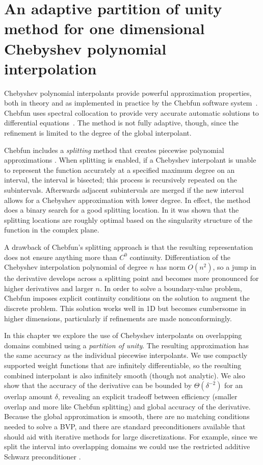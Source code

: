 %
%
\chapter{An adaptive partition of unity method for one dimensional Chebyshev polynomial interpolation}
Chebyshev polynomial interpolants provide powerful approximation properties, both in theory and as implemented in practice by the Chebfun software system~\cite{battles2004extension}. Chebfun uses spectral collocation to provide very accurate automatic solutions to differential equations~\cite{driscoll2008chebop}. The method is not fully adaptive, though, since the refinement is limited to the degree of the global interpolant. 

 Chebfun includes a \textit{splitting} method that creates piecewise polynomial approximations \cite{pachon2010piecewise}. When splitting is enabled, if a Chebyshev interpolant is unable to represent the function accurately at a specified maximum degree on an interval, the interval is bisected; this process is recursively repeated on the subintervals. Afterwards adjacent subintervals are merged if the new interval allows for a Chebyshev approximation with lower degree. In effect, the method does a binary search for a good splitting location. In \cite{driscoll2014optimal} it was shown that the splitting locations are roughly optimal based on the singularity structure of the function in the complex plane. 

A drawback of Chebfun's splitting approach is that the resulting representation does not ensure anything more than $C^0$ continuity. Differentiation of the Chebyshev interpolation polynomial of degree $n$ has norm $O(n^2)$, so a jump in the derivative develops across a splitting point and becomes more pronounced for higher derivatives and larger $n$. In order to solve a boundary-value problem, Chebfun imposes explicit continuity conditions on the solution to augment the discrete problem. This solution works well in 1D but becomes cumbersome in higher dimensions, particularly if refinements are made nonconformingly.

In this chapter we explore the use of Chebyshev interpolants on overlapping domains combined using a \emph{partition of unity}. The resulting approximation has the same accuracy as the individual piecewise interpolants. We use compactly supported weight functions that are infinitely differentiable, so the resulting combined interpolant is also infinitely smooth (though not analytic). We also show that the accuracy of the derivative can be bounded by $\Theta(\delta^{-2})$ for an overlap amount $\delta$, revealing an explicit tradeoff between efficiency (smaller overlap and more like Chebfun splitting) and global accuracy of the derivative. Because the global approximation is smooth, there are no matching conditions needed to solve a BVP, and there are standard preconditioners available that should aid with iterative methods for large discretizations. For example, since we split the interval into overlapping domains we could use the restricted additive Schwarz preconditioner \cite{doi:10.1137/S106482759732678X}.

